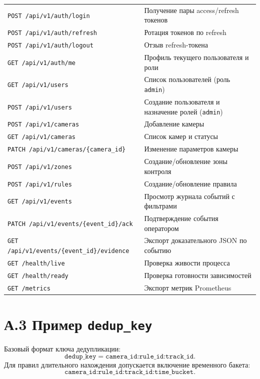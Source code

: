 \begin{longtable}{@{}p{}p{}@{}}
\nolinkurl{POST /api/v1/auth/login} & Получение пары access/refresh токенов \\
\nolinkurl{POST /api/v1/auth/refresh} & Ротация токенов по refresh \\
\nolinkurl{POST /api/v1/auth/logout} & Отзыв refresh-токена \\
\nolinkurl{GET /api/v1/auth/me} & Профиль текущего пользователя и роли \\
\nolinkurl{GET /api/v1/users} & Список пользователей (роль \texttt{admin}) \\
\nolinkurl{POST /api/v1/users} & Создание пользователя и назначение ролей (\texttt{admin}) \\
\nolinkurl{POST /api/v1/cameras} & Добавление камеры \\
\nolinkurl{GET /api/v1/cameras} & Список камер и статусы \\
\nolinkurl{PATCH /api/v1/cameras/{camera_id}} & Изменение параметров камеры \\
\nolinkurl{POST /api/v1/zones} & Создание/обновление зоны контроля \\
\nolinkurl{POST /api/v1/rules} & Создание/обновление правила \\
\nolinkurl{GET /api/v1/events} & Просмотр журнала событий с фильтрами \\
\nolinkurl{PATCH /api/v1/events/{event_id}/ack} & Подтверждение события оператором \\
\nolinkurl{GET /api/v1/events/{event_id}/evidence} & Экспорт доказательного JSON по событию \\
\nolinkurl{GET /health/live} & Проверка живости процесса \\
\nolinkurl{GET /health/ready} & Проверка готовности зависимостей \\
\nolinkurl{GET /metrics} & Экспорт метрик Prometheus \\
\end{longtable}

\section*{А.3 Пример \texttt{dedup\_key}}
{}

Базовый формат ключа дедупликации:
\begin{equation}
\texttt{dedup\_key} = \texttt{camera\_id:rule\_id:track\_id}.
\end{equation}
Для правил длительного нахождения допускается включение временного бакета:
\begin{equation}
\texttt{camera\_id:rule\_id:track\_id:time\_bucket}.
\end{equation}
